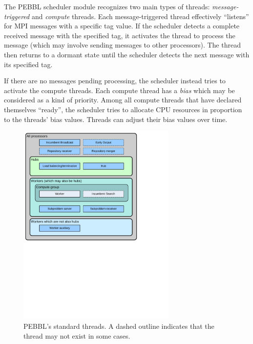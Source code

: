 The PEBBL scheduler module recognizes two main types of threads:
\emph{message-triggered} and \emph{compute} threads.  Each
message-triggered thread effectively ``listens'' for MPI messages with
a specific tag value.  If the scheduler detects a complete received
message with the specified tag, it activates the thread to process the
message (which may involve sending messages to other processors).  The
thread then returns to a dormant state until the scheduler detects the
next message with its specified tag.

If there are no messages pending processing, the scheduler instead
tries to activate the compute threads.  Each compute thread has a
\emph{bias} which may be considered as a kind of priority.  Among all
compute threads that have declared themselves ``ready'', the scheduler
tries to allocate CPU resources in proportion to the threads'
bias values.  Threads can adjust their bias values over time.  

\begin{figure}[tbp]
\begin{center}
\includegraphics[width=0.7\textwidth]{threads-new}
\vspace{-0.2in}
\end{center}
\caption{PEBBL's standard threads.  A dashed outline
indicates that the thread may not exist in some cases.}
\label{fig:threads}
\end{figure}


